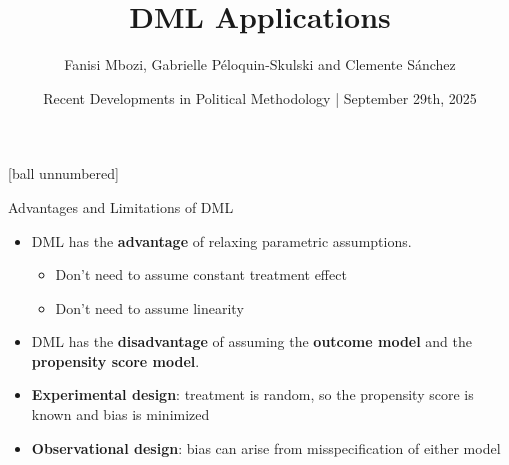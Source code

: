 \documentclass[10pt,table,aspectratio=169]{beamer}
\title{DML Applications}
\author{\vspace{-0.75em} Fanisi Mbozi, Gabrielle Péloquin-Skulski and Clemente Sánchez}
\date{\vspace{0.5em} Recent Developments in Political Methodology | September 29th, 2025}
\begin{document}
\maketitle


[ball unnumbered]



\begin{frame}[plain, label = two_dimensions]{Advantages and Limitations of DML}

\begin{itemize}
    \item DML has the \alert{\bf advantage} of relaxing parametric assumptions.  
    \begin{itemize}
        \item Don't need to assume constant treatment effect
        \item Don't need to assume linearity \pause
    \end{itemize}
        \vspace{0.5em}
    \item DML has the \alert{\bf disadvantage} of assuming the \alert{\bf outcome model} and the \alert{\bf propensity score model}. \pause
        \vspace{0.5em}
    \item \alert{\bf Experimental design}: treatment is random, so the propensity score is known and bias is minimized \pause
        \vspace{0.5em}
    \item \alert{\bf Observational design}: bias can arise from misspecification of either model 
\end{itemize}
\end{frame}
\end{document}
